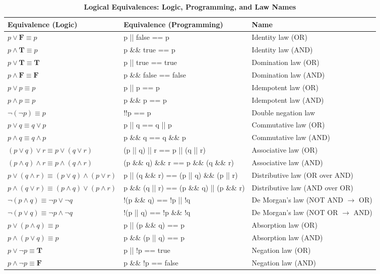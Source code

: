 \begin{table}[h!]
\centering
\renewcommand{\arraystretch}{1.3} %
\caption*{\textbf{Logical Equivalences: Logic, Programming, and Law Names}}
\begin{tabular}{|
    >{\centering\arraybackslash}m{5cm}
    |>{\centering\arraybackslash}m{7cm}
    |>{\centering\arraybackslash}m{4cm}|}
\hline
\rowcolor{gray!20}
\textbf{Equivalence (Logic)} & \textbf{Equivalence (Programming)} &\textbf{Name} \\
\hline
$p \lor \mathbf{F} \equiv p$ & p || false == p & Identity law (OR) \\
$p \land \mathbf{T} \equiv p$ & p \&\& true == p &Identity law (AND) \\
\hline
$p \lor \mathbf{T} \equiv \mathbf{T}$ & p || true == true & Domination law (OR) \\
$p \land \mathbf{F} \equiv \mathbf{F}$ & p \&\& false == false &  Domination law (AND) \\
\hline
$p \lor p \equiv p$ & p || p == p &  Idempotent law (OR) \\
$p \land p \equiv p$ & p \&\& p == p & Idempotent law (AND) \\
\hline
$\neg(\neg p) \equiv p$ & !!p == p & Double negation law \\
\hline
$p \lor q \equiv q \lor p$ & p || q == q || p & Commutative law (OR) \\
$p \land q \equiv q \land p$ & p \&\& q == q \&\& p & Commutative law (AND) \\
\hline
$(p \lor q) \lor r \equiv p \lor (q \lor r)$ & (p || q) || r == p || (q || r) & Associative law (OR) \\
$(p \land q) \land r \equiv p \land (q \land r)$ & (p \&\& q) \&\& r == p \&\& (q \&\& r) & Associative law (AND)  \\
\hline
$p \lor (q \land r) \equiv (p \lor q) \land (p \lor r)$ & p || (q \&\& r) == (p || q) \&\& (p || r)  & Distributive law (OR over AND) \\
$p \land (q \lor r) \equiv (p \land q) \lor (p \land r)$ & p \&\& (q || r) == (p \&\& q) || (p \&\& r) & Distributive law (AND over OR) \\
\hline
$\neg(p \land q) \equiv \neg p \lor \neg q$ & !(p \&\& q) == !p || !q &  De Morgan’s law (NOT AND $\rightarrow $ OR) \\
$\neg(p \lor q) \equiv \neg p \land \neg q$ & !(p || q) == !p \&\& !q & De Morgan’s law (NOT OR $\rightarrow$ AND) \\
\hline
$p \lor (p \land q) \equiv p$ & p || (p \&\& q) == p & Absorption law (OR) \\
$p \land (p \lor q) \equiv p$ & p \&\& (p || q) == p & Absorption law (AND) \\
\hline
$p \lor \neg p \equiv \mathbf{T}$ & p || !p == true   & Negation law (OR) \\
$p \land \neg p \equiv \mathbf{F}$ & p \&\& !p == false & Negation law (AND) \\
\hline
\end{tabular}
\end{table}

